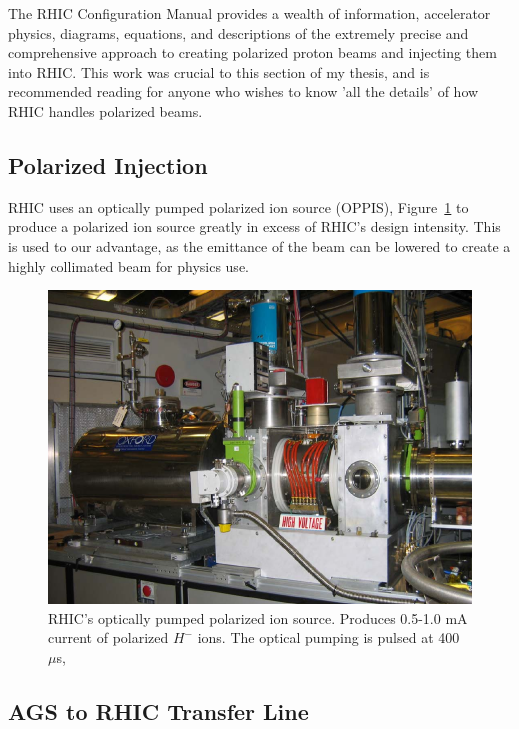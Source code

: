 The RHIC Configuration Manual \cite{RHIC2006} provides a wealth of information,
accelerator physics, diagrams, equations, and descriptions of the extremely
precise and comprehensive approach to creating polarized proton beams and
injecting them into RHIC. This work was crucial to this section of my thesis,
and is recommended reading for anyone who wishes to know 'all the details' of
how RHIC handles polarized beams.

\subsection{Polarized Injection}

RHIC uses an optically pumped polarized ion source (OPPIS),
Figure~\ref{fig:rhic_oppis} to produce a polarized ion source greatly in excess
of RHIC's design intensity. This is used to our advantage, as the emittance of
the beam can be lowered to create a highly collimated beam for physics use.

\begin{figure}[ht]
	\centering
	\includegraphics[width=0.8\linewidth]{./figures/rhic_oppis.png}
	\caption{
		RHIC's optically pumped polarized ion source. Produces 0.5-1.0 mA current of
		polarized $H^-$ ions. The optical pumping is pulsed at 400
		$\mu$s, \cite{Zelenski2007}
	}
	\label{fig:rhic_oppis}
\end{figure}

\clearpage
\subsection{AGS to RHIC Transfer Line}

